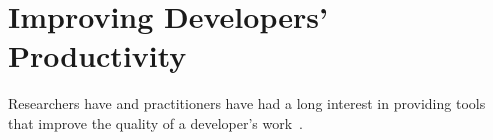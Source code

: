 



\section{Improving Developers' Productivity}
\label{cp2:dev-productivity}




Researchers have and practitioners  have had a long interest 
in providing tools that improve the quality of a developer's work~\cite{Kersten2006, Meyer2017, satterfield2020}. 


















